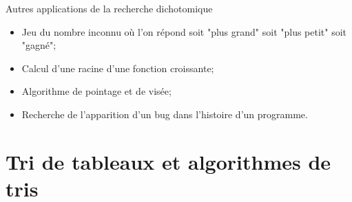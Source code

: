 \documentclass[10pt,xcolor=dvipsnames]{beamer}
\newcommand*\Let[2]{\State #1 $\gets$ #2}
\begin{document}
% 
% 
% 
% 
% 
% 

\begin{frame}{Autres applications de la recherche dichotomique}

\begin{itemize}
    \item Jeu du nombre inconnu où l'on répond soit "plus grand" soit "plus petit" soit "gagné";
    \item Calcul d'une racine d'une fonction croissante;
    \item Algorithme de pointage et de visée;
    \item Recherche de l'apparition d'un bug dans l'histoire d'un programme.
\end{itemize}
\end{frame}

\section{Tri de tableaux et algorithmes de tris}
\end{document}
